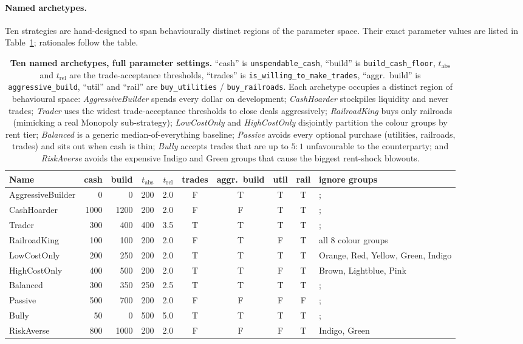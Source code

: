 \documentclass[10pt]{article}
\begin{document}
\paragraph{Named archetypes.} Ten strategies are hand-designed to span
behaviourally distinct regions of the parameter space. Their exact
parameter values are listed in Table~\ref{tab:archetypes}; rationales
follow the table.

\begin{table}[h!]
\centering
\scriptsize
\begin{tabular}{lrrrrccccl}
\toprule
Name & cash & build & $t_{\text{abs}}$ & $t_{\text{rel}}$ & trades & aggr.\ build & util & rail & ignore groups \\
\midrule
AggressiveBuilder & 0    & 0    & 200 & 2.0 & F & T & T & T &; \\
CashHoarder       & 1000 & 1200 & 200 & 2.0 & F & F & T & T &; \\
Trader            & 300  & 400  & 400 & 3.5 & T & T & T & T &; \\
RailroadKing      & 100  & 100  & 200 & 2.0 & F & T & F & T & all 8 colour groups \\
LowCostOnly       & 200  & 250  & 200 & 2.0 & T & T & T & T & Orange, Red, Yellow, Green, Indigo \\
HighCostOnly      & 400  & 500  & 200 & 2.0 & T & T & F & T & Brown, Lightblue, Pink \\
Balanced          & 300  & 350  & 250 & 2.5 & T & T & T & T &; \\
Passive           & 500  & 700  & 200 & 2.0 & F & F & F & F &; \\
Bully             & 50   & 0    & 500 & 5.0 & T & T & T & T &; \\
RiskAverse        & 800  & 1000 & 200 & 2.0 & F & F & F & T & Indigo, Green \\
\bottomrule
\end{tabular}
\caption{\textbf{Ten named archetypes, full parameter settings.}
``cash'' is \texttt{unspendable\_cash}, ``build'' is
\texttt{build\_cash\_floor}, $t_{\text{abs}}$ and $t_{\text{rel}}$ are the
trade-acceptance thresholds, ``trades'' is
\texttt{is\_willing\_to\_make\_trades}, ``aggr.\ build'' is
\texttt{aggressive\_build}, ``util'' and ``rail'' are
\texttt{buy\_utilities} / \texttt{buy\_railroads}. Each archetype
occupies a distinct region of behavioural space:
\textsl{AggressiveBuilder} spends every dollar on development;
\textsl{CashHoarder} stockpiles liquidity and never trades;
\textsl{Trader} uses the widest trade-acceptance thresholds to close
deals aggressively; \textsl{RailroadKing} buys only railroads (mimicking
a real Monopoly sub-strategy); \textsl{LowCostOnly} and
\textsl{HighCostOnly} disjointly partition the colour groups by rent
tier; \textsl{Balanced} is a generic median-of-everything baseline;
\textsl{Passive} avoids every optional purchase (utilities, railroads,
trades) and sits out when cash is thin; \textsl{Bully} accepts trades
that are up to $5{:}1$ unfavourable to the counterparty; and
\textsl{RiskAverse} avoids the expensive Indigo and Green groups that
cause the biggest rent-shock blowouts.}
\label{tab:archetypes}
\end{table}
\end{document}
